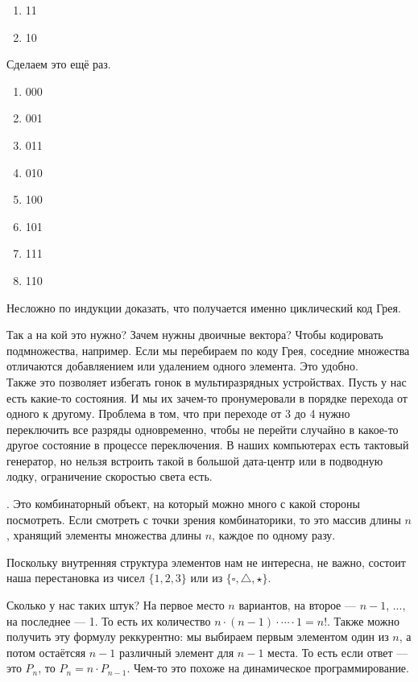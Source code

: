 \documentclass{article}
\begin{document}
\begin{itemize}
\begin{Proof}
\begin{enumerate}
                \item 11
                \item 10
            \end{enumerate}
            Сделаем это ещё раз.
            \begin{enumerate}
                \addtocounter{enumi}{-1}
                \item 000
                \item 001
                \item 011
                \item 010
                \item 100
                \item 101
                \item 111
                \item 110
            \end{enumerate}
            Несложно по индукции доказать, что получается именно циклический код Грея.
        \end{Proof}
        \begin{Proof}
            Так а на кой это нужно? Зачем нужны двоичные вектора? Чтобы кодировать подмножества, например. Если мы перебираем по коду Грея, соседние множества отличаются добавляением или удалением одного элемента. Это удобно.\\
            Также это позволяет избегать гонок в мультиразрядных устройствах. Пусть у нас есть какие-то состояния. И мы их зачем-то пронумеровали в порядке перехода от одного к другому. Проблема в том, что при переходе от 3 до 4 нужно переключить все разряды одновременно, чтобы не перейти случайно в какое-то другое состояние в процессе переключения. В наших компьютерах есть тактовый генератор, но нельзя встроить такой в большой дата-центр или в подводную лодку, ограничение скоростью света есть.
        \end{Proof}
        \dfn {}. Это комбинаторный объект, на который можно много с какой стороны посмотреть. Если смотреть с точки зрения комбинаторики, то это массив длины $n$, хранящий элементы множества длины $n$, каждое по одному разу.
        \begin{Comment}
            Поскольку внутренняя структура элементов нам не интересна, не важно, состоит наша перестановка из чисел $\{1,2,3\}$ или из $\{\square,\triangle,\star\}$.
        \end{Comment}
        \begin{Comment}
            Сколько у нас таких штук? На первое место $n$ вариантов, на второе --- $n-1$, ..., на последнее --- 1. То есть их количество $n\cdot(n-1)\cdot\cdots\cdot1=n!$. Также можно получить эту формулу реккурентно: мы выбираем первым элементом один из $n$, а потом остаётсяя $n-1$ различный элемент для $n-1$ места. То есть если ответ --- это $P_n$, то $P_n=n\cdot P_{n-1}$. Чем-то это похоже на динамическое программирование.\\

\end{Comment}
\end{itemize}
\end{document}

